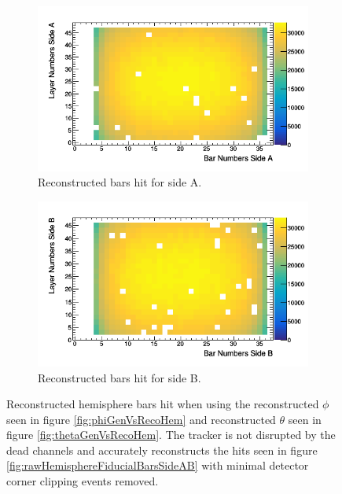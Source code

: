 \begin{figure}[!h]
\centering
\begin{subfigure}{.5\textwidth}
  \centering
  \includegraphics[width=\linewidth]{Chapter5/Figs/Raster/hemisphereFiducialBarsSideA.png}
  \captionsetup{width=.9\linewidth}
  \caption{Reconstructed bars hit for side A.}
  \label{subFig:hemisphereFiducialBarsSideA}
\end{subfigure}%
\begin{subfigure}{.5\textwidth}
  \centering
\includegraphics[width=\linewidth]{Chapter5/Figs/Raster/hemisphereFiducialBarsSideB.png}
  \captionsetup{width=.9\linewidth}
  \caption{Reconstructed bars hit for side B.}
  \label{subFig:hemisphereFiducialBarsSideB}
\end{subfigure}
\caption{Reconstructed hemisphere bars hit when using the reconstructed $\phi$ seen in figure \ref{fig:phiGenVsRecoHem} and reconstructed $\theta$ seen in figure \ref{fig:thetaGenVsRecoHem}. The tracker is not disrupted by the dead channels and accurately reconstructs the hits seen in figure \ref{fig:rawHemisphereFiducialBarsSideAB} with minimal detector corner clipping events removed.}
\label{fig:HemisphereFiducialBarsSideAB}
\end{figure}

